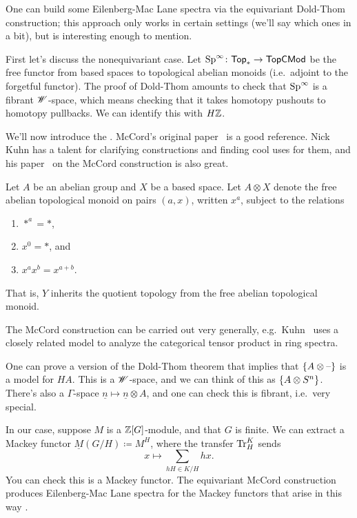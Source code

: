 \begin{cons}
One can build some Eilenberg-Mac Lane spectra via the equivariant Dold-Thom construction; this approach only works
in certain settings (we'll say which ones in a bit), but is interesting enough to mention.

First let's discuss the nonequivariant case. Let $\mathrm{Sp}^\infty\colon\mathsf{Top}_*\to\mathsf{TopCMod}$ be the free functor
from based spaces to topological abelian monoids (i.e.\ adjoint to the forgetful functor). The proof of Dold-Thom
amounts to check that $\mathrm{Sp}^\infty$ is a fibrant $\mathscr W$-space, which means checking that it takes homotopy pushouts
to homotopy pullbacks. We can identify this with $H\mathbb Z$.

We'll now introduce the . McCord's original paper~\cite{McCord} is a good reference. Nick
Kuhn has a talent for clarifying constructions and finding cool uses for them, and his paper~\cite{KuhnMcCord} on
the McCord construction is also great.

Let $A$ be an abelian group and $X$ be a based space. Let $A\otimes X$ denote the free abelian topological monoid
on pairs $(a,x)$, written $x^a$, subject to the relations
\begin{enumerate}
	\item $*^a = *$,
	\item $x^0 = *$, and
	\item $x^ax^b = x^{a+b}$.
\end{enumerate}
That is, $Y$ inherits the quotient topology from the free abelian topological monoid.
\begin{rem}
The McCord construction can be carried out very generally, e.g.\ Kuhn~\cite{KuhnMcCord} uses a closely related
model to analyze the categorical tensor product in ring spectra.
\end{rem}
One can prove a version of the Dold-Thom theorem that implies that $\{A\otimes\text{--}\}$ is a model for $HA$. This is
a $\mathscr W$-space, and we can think of this as $\{A\otimes S^n\}$. There's also a $\Gamma$-space $\underline n\mapsto
\underline n\otimes A$, and one can check this is fibrant, i.e.\ very special.

In our case, suppose $M$ is a $\mathbb Z[G]$-module, and that $G$ is finite. We can extract a Mackey functor $\underline
M(G/H)\coloneqq M^H$, where the transfer $\operatorname{Tr}_H^K$ sends
\[x\mapsto \sum_{hH\in K/H} hx.\]
You can check this is a Mackey functor. The equivariant McCord construction produces Eilenberg-Mac Lane spectra for
the Mackey functors that arise in this way .


\end{cons}
